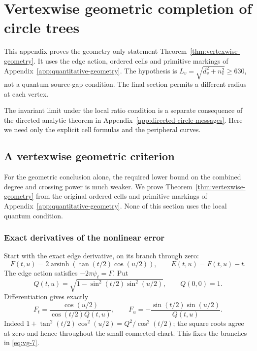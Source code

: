 \chapter{Vertexwise geometric completion of circle trees}
\label{app:local-messages}

This appendix proves the geometry-only statement
Theorem~\ref{thm:vertexwise-geometry}. It uses the edge action,
ordered cells and primitive markings of
Appendix~\ref{app:quantitative-geometry}. The hypothesis is
\(L_v=\sqrt{d_v^2+n_v^2}\ge630\), not a quantum source-gap condition.
The final section permits a different radius at each vertex.

The invariant limit under the local ratio condition is a separate
consequence of the directed analytic theorem in
Appendix~\ref{app:directed-circle-messages}. Here we need only the
explicit cell formulas and the peripheral curves.

\section{A vertexwise geometric criterion}\label{sec:vg-derivatives}

For the geometric conclusion alone, the required lower bound on the
combined degree and crossing power is much weaker. We prove Theorem~\ref{thm:vertexwise-geometry} from the original
ordered cells and primitive markings of
Appendix~\ref{app:quantitative-geometry}. None of this section uses
the local quantum condition.

\subsection{Exact derivatives of the nonlinear error}\label{sec:vg-2}

Start with the exact edge derivative, on its branch through zero:
\begin{equation}\label{eq:vg-5}
F(t,u)=2\operatorname{arsinh}\!
          \left(\tan(t/2)\cos(u/2)\right),\qquad
 E(t,u)=F(t,u)-t.
\end{equation} The edge action satisfies \(-2\pi\psi_t=F\). Put \begin{equation}\label{eq:vg-6}
Q(t,u)=\sqrt{1-\sin^2(t/2)\sin^2(u/2)},\qquad Q(0,0)=1.
\end{equation} Differentiation gives exactly \begin{equation}\label{eq:vg-7}
F_t=\frac{\cos(u/2)}{\cos(t/2)Q(t,u)},\qquad
 F_u=-\frac{\sin(t/2)\sin(u/2)}{Q(t,u)}.
\end{equation} Indeed \(1+\tan^2(t/2)\cos^2(u/2)=Q^2/\cos^2(t/2)\); the square roots agree at zero and hence throughout the small connected chart. This fixes the branches in \eqref{eq:vg-7}.

